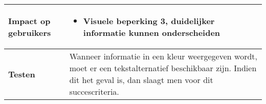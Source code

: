 \begin{table}[H]
\begin{tabular}{|l|p{12cm}|}
        \hline
        \textbf{Impact op gebruikers}         &  
        \begin{itemize}
            \item Visuele beperking 3, duidelijker informatie kunnen onderscheiden 
        \end{itemize}                                                                                                                                                                                                                                                                                                                                                                                                            \\ 
        \hline
        \textbf{Testen}                       & Wanneer informatie in een kleur weergegeven wordt, moet er een tekstalternatief beschikbaar zijn. Indien dit het geval is, dan slaagt men voor dit succescriteria.                                                                                                                                                                                                                                                                                            \\
        \hline
    \end{tabular}
\end{table}

